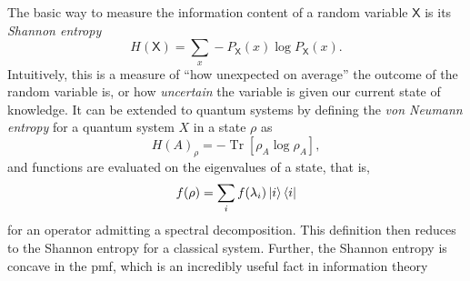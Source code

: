 \documentclass[10pt, a4paper]{article}
\numberwithin{equation}{section} %
\theoremstyle{definition}
\theoremstyle{plain}
\newcommand{\?}{\mathrel{?}} %
\newcommand{\Tr}[2][]{\mathop{\mathrm{Tr}#1}\left[ #2 \right]} %
\newcommand{\crv}[1]{\mathsf{#1}}
\begin{document}
\begin{appendices}
                    The basic way to measure the information content of a random variable \(\crv{X}\) is its \emph{Shannon entropy}
                    \begin{equation}
                      H(\crv{X}) = \sum_{x} - P_{\crv{X}}(x) \log P_{\crv{X}}(x).
                    \end{equation}
                    Intuitively, this is a measure of ``how unexpected on average'' the outcome of the random variable is, or how \emph{uncertain} the variable is given our current state of knowledge. It can be extended to quantum systems by defining the \emph{von Neumann entropy} for a quantum system \(X\) in a state \(\rho\) as 
                    \begin{equation}
                        {H(A)}_{\rho} = -\Tr{\rho_{A}\log\rho_{A}},
                    \end{equation}
                    and functions are evaluated on the eigenvalues of a state, that is,
                    \begin{equation}
                      f(\rho) = \sum_i f(\lambda_i) \ket{i}\bra{i}
                    \end{equation}
                    for an operator admitting a spectral decomposition. This definition then reduces to the Shannon entropy for a classical system. Further, the Shannon entropy is concave in the pmf, which is an incredibly useful fact in information theory


\end{appendices}
\end{document}

